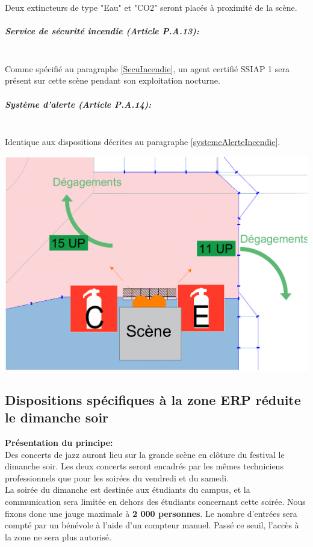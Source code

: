 \documentclass[hidelinks, paper=a4, fontsize=13pt]{report}
\begin{document}
Deux extincteurs de type "Eau" et "CO2" seront placés à proximité de la scène.

\subparagraph*{Service de sécurité incendie (Article P.A.13):}\mbox{}\\

Comme spécifié au paragraphe \ref{SecuIncendie}, un agent certifié SSIAP 1 sera présent sur cette scène pendant son exploitation nocturne. \\

\subparagraph*{Système d'alerte (Article P.A.14):}\mbox{}\\

Identique aux dispositions décrites au paragraphe \ref{systemeAlerteIncendie}.

\begin{center}
	\includegraphics[width=.8\textwidth,keepaspectratio]{Exports/Plan_24h_45eme-3e_Scene_Secu_Incendie}
\end{center}

\newpage 

\subsection{Dispositions spécifiques à la zone ERP réduite le dimanche soir}

\textbf{Présentation du principe:}\\
Des concerts de jazz auront lieu sur la grande scène en clôture du festival le dimanche soir. Les deux concerts seront encadrés par les mêmes techniciens professionnels que pour les soirées du vendredi et du samedi.\\

La soirée du dimanche est destinée aux étudiants du campus, et la communication sera limitée en dehors des étudiants concernant cette soirée. Nous fixons donc une jauge maximale à \textbf{2 000 personnes}. Le nombre d'entrées sera compté par un bénévole à l'aide d'un compteur manuel. Passé ce seuil, l'accès à la zone ne sera plus autorisé.\\
\end{document}
